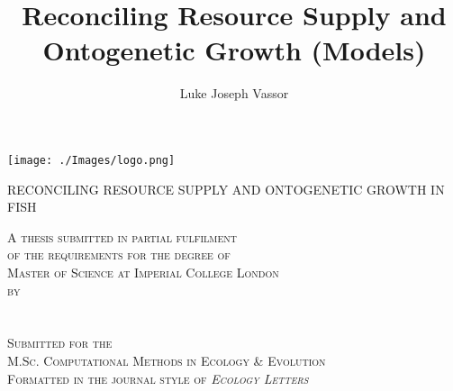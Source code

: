 \documentclass[a4paper]{article} %
\title{Reconciling Resource Supply and Ontogenetic Growth (Models)}
\author{Luke Joseph Vassor}
\begin{document}
\begin{titlepage}
    
    \texttt{[image: ./Images/logo.png]}\\%
     
    
    \center %
    
    
    \makeatletter
    \linespread{1.5} %
        {\huge{RECONCILING RESOURCE SUPPLY AND ONTOGENETIC GROWTH IN FISH}\par} %
    \vspace{2.5cm} %

    \textsc{A thesis submitted in partial fulfilment \\ of the requirements for the degree of \\ Master of Science at Imperial College London \\ by \\ \ }\\[2.5cm]
    \textsc{\Large \@author}\\[2.5cm]
    \textsc{Submitted for the \\ M.Sc. Computational Methods in Ecology \& Evolution \\ Formatted in the journal style of \textsl{\textsc{Ecology Letters}} \\ \ }\\[2cm]


\end{titlepage}
\end{document}

